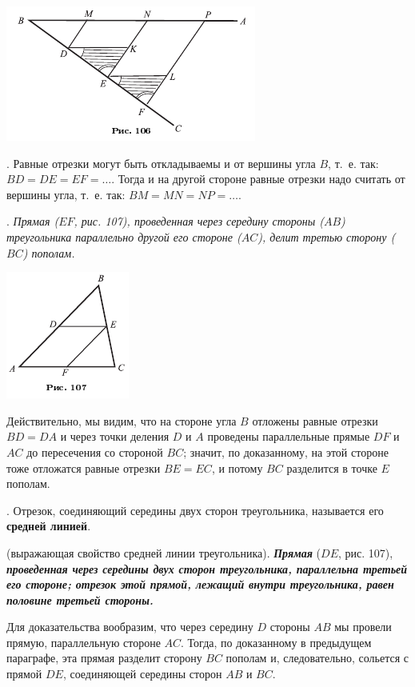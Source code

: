 \documentclass[oneside]{book}
\begin{document}
\includegraphics{pics/ris-106}

.
Равные отрезки могут быть откладываемы и от вершины угла $B$, т.~е.
так:
$BD=DE= EF=\dots$.
Тогда и на другой стороне равные отрезки надо считать от вершины угла, т.~е. так:
$BM=MN=NP=\dots$.

.
\emph{Прямая \emph{($EF$, рис. 107),} проведенная через середину стороны ($AB$) треугольника параллельно другой его стороне ($AC$), делит третью сторону ($BC$) пополам.}

\includegraphics{pics/ris-107}

Действительно, мы видим, что на стороне угла $B$ отложены равные отрезки $BD=DA$ и через точки деления $D$ и $A$ проведены параллельные прямые $DF$ и $AC$ до пересечения со стороной $BC$;
значит, по доказанному, на этой стороне тоже отложатся равные отрезки $BE=EC$, и потому $BC$ разделится в точке $E$ пополам.

.
Отрезок, соединяющий середины двух сторон треугольника, называется его \textbf{средней линией}.

 (выражающая свойство средней линии треугольника).
\textbf{\emph{Прямая}} ($DE$, рис. 107), \textbf{\emph{проведенная через середины двух сторон треугольника, параллельна третьей его стороне;
отрезок этой прямой, лежащий внутри треугольника, равен половине третьей стороны.}}

Для доказательства вообразим, что через середину $D$ стороны $AB$ мы провели прямую, параллельную стороне $AC$.
Тогда, по доказанному в предыдущем параграфе, эта прямая разделит сторону $BC$ пополам и, следовательно, сольется с прямой $DE$, соединяющей середины сторон $AB$ и $BC$.
\end{document}
